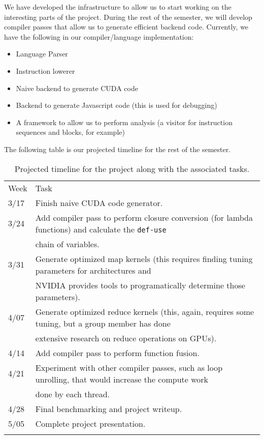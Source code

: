 We have developed the infrastructure to allow us to start working on the
interesting parts of the project. During the rest of the semester, we
will develop compiler passes that allow us to generate efficient backend
code. Currently, we have the following in our compiler/language
implementation:

\begin{itemize}
\itemsep1pt\parskip0pt
\item
  Language Parser
\item
  Instruction lowerer
\item
  Naive backend to generate CUDA code
\item
  Backend to generate Javascript code (this is used for debugging)
\item
  A framework to allow us to perform analysis (a visitor for instruction
  sequences and blocks, for example)
\end{itemize}

The following table is our projected timeline for the rest of the
semester.

\begin{longtable}[c]{@{}ll@{}}
\hline\noalign{\medskip}
Week & Task
\\\noalign{\medskip}
\hline\noalign{\medskip}
3/17 & Finish naive CUDA code generator.
\\\noalign{\medskip}
3/24 & Add compiler pass to perform closure conversion (for lambda
functions) and calculate the \texttt{def-use}
\\\noalign{\medskip}
& chain of variables.
\\\noalign{\medskip}
3/31 & Generate optimized map kernels (this requires finding tuning
parameters for architectures and
\\\noalign{\medskip}
& NVIDIA provides tools to programatically determine those parameters).
\\\noalign{\medskip}
4/07 & Generate optimized reduce kernels (this, again, requires some
tuning, but a group member has done
\\\noalign{\medskip}
& extensive research on reduce operations on GPUs).
\\\noalign{\medskip}
4/14 & Add compiler pass to perform function fusion.
\\\noalign{\medskip}
4/21 & Experiment with other compiler passes, such as loop unrolling,
that would increase the compute work
\\\noalign{\medskip}
& done by each thread.
\\\noalign{\medskip}
4/28 & Final benchmarking and project writeup.
\\\noalign{\medskip}
5/05 & Complete project presentation.
\\\noalign{\medskip}
\hline
\noalign{\medskip}
\caption{Projected timeline for the project along with the associated
tasks.}
\end{longtable}

